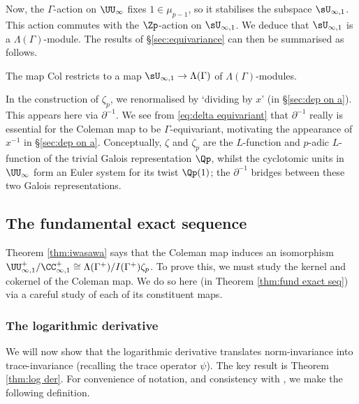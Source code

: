 \documentclass[a4paper,10pt, english, reqno]{smfart}
\newcommand{\GG}{\Gamma}
\numberwithin{equation}{section}
\begin{document}
Now, the $\GG$-action on $\UU_\infty$ fixes $1 \in \mu_{p-1}$, so it stabilises the subspace $\sU_{\infty,1}$. This action commutes with the $\Zp$-action on $\sU_{\infty,1}$. We deduce that $\sU_{\infty,1}$ is a $\Lambda(\GG)$-module. The results of \S\ref{sec:equivariance} can then be summarised as follows.

\begin{corollary}\label{cor:G-eq}
	The map $\mathrm{Col}$ restricts to a map $\sU_{\infty,1} \to \Lambda(\GG)$ of $\Lambda(\GG)$-modules.
\end{corollary}



\begin{remark}\label{rem:renormalise}
	In the construction of $\zeta_p$, we renormalised by `dividing by $x$' (in \S\ref{sec:dep on a}). This appears here via $\partial^{-1}$. We see from \eqref{eq:delta equivariant} that $\partial^{-1}$ really is essential for the Coleman map to be $\GG$-equivariant, motivating the appearance of $x^{-1}$ in \S\ref{sec:dep on a}.  Conceptually, $\zeta$ and $\zeta_p$ are the $L$-function and $p$-adic $L$-function of the trivial Galois representation $\Qp$, whilst the cyclotomic units in $\UU_\infty$ form an Euler system for its twist $\Qp(1)$; the $\partial^{-1}$ bridges between these two Galois representations.
\end{remark}











\subsection{The fundamental exact sequence}
Theorem \ref{thm:iwasawa} says that the Coleman map induces an isomorphism $\UU_{\infty,1}^+/\CC_{\infty,1}^+ \cong \Lambda(\GG^+)/I(\GG^+)\zeta_p$. To prove this, we must study the kernel and cokernel of the Coleman map. We do so here (in Theorem \ref{thm:fund exact seq}) via a careful study of each of its constituent maps.

\subsubsection{The logarithmic derivative}

\label{sec:logarithmic der}

We will now show that the logarithmic derivative translates norm-invariance into trace-invariance (recalling the trace operator $\psi$). The key result is Theorem \ref{thm:log der}. For convenience of notation, and consistency with \cite{CS06}, we make the following definition.
\end{document}
